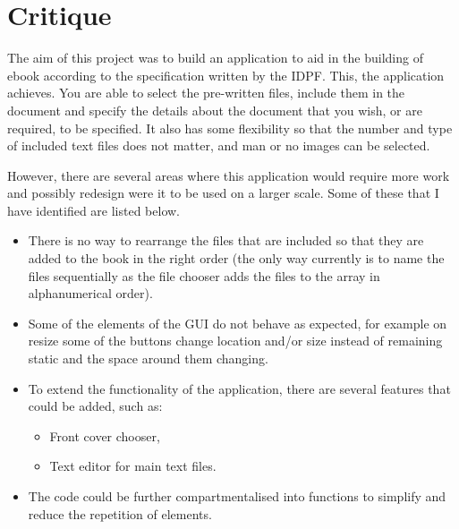 \documentclass[11pt]{article} %
\begin{document}
\section{Critique}
The aim of this project was to build an application to aid in the building of ebook according to the specification written by the IDPF. This, the application achieves. You are able to select the pre-written files, include them in the document and specify the details about the document that you wish, or are required, to be specified. It also has some flexibility so that the number and type of included text files does not matter, and man or no images can be selected.

However, there are several areas where this application would require more work and possibly redesign were it to be used on a larger scale. Some of these that I have identified are listed below.
\begin{itemize}
  \item There is no way to rearrange the files that are included so that they are added to the book in the right order (the only way currently is to name the files sequentially as the file chooser adds the files to the array in alphanumerical order).
  \item Some of the elements of the GUI do not behave as expected, for example on resize some of the buttons change location and/or size instead of remaining static and the space around them changing.
  \item To extend the functionality of the application, there are several features that could be added, such as:
    \begin{itemize}
      \item Front cover chooser,
      \item Text editor for main text files.
    \end{itemize}
  \item The code could be further compartmentalised into functions to simplify and reduce the repetition of elements.
\end{itemize}
\end{document}
